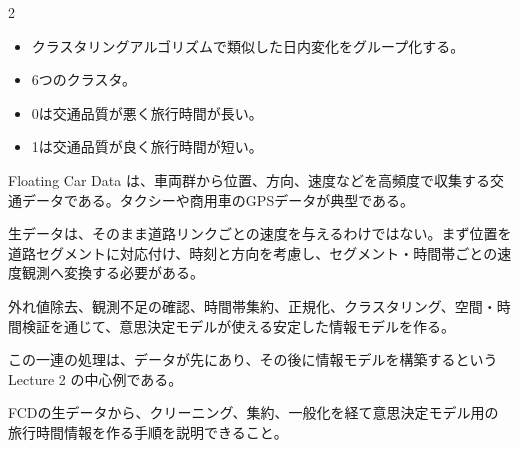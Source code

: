 \begin{multicols}{2}

\footnotesize

\raggedcolumns


\begin{itemize}
\item クラスタリングアルゴリズムで類似した日内変化をグループ化する。
\item 6つのクラスタ。
\item 0は交通品質が悪く旅行時間が長い。
\item 1は交通品質が良く旅行時間が短い。
\end{itemize}

Floating Car Data は、車両群から位置、方向、速度などを高頻度で収集する交通データである。タクシーや商用車のGPSデータが典型である。\par

生データは、そのまま道路リンクごとの速度を与えるわけではない。まず位置を道路セグメントに対応付け、時刻と方向を考慮し、セグメント・時間帯ごとの速度観測へ変換する必要がある。\par

外れ値除去、観測不足の確認、時間帯集約、正規化、クラスタリング、空間・時間検証を通じて、意思決定モデルが使える安定した情報モデルを作る。\par

この一連の処理は、データが先にあり、その後に情報モデルを構築するという Lecture 2 の中心例である。\par

FCDの生データから、クリーニング、集約、一般化を経て意思決定モデル用の旅行時間情報を作る手順を説明できること。\par



\end{multicols}
